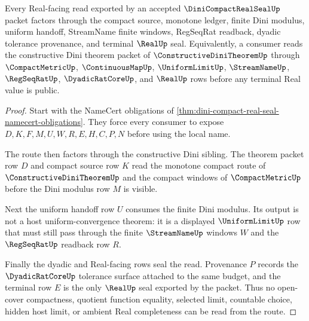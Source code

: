 \begin{theorem}
\label{thm:dini-compact-real-seal-uniform-route}
Every Real-facing read exported by an accepted $\DiniCompactRealSealUp$ packet factors through the compact source, monotone ledger, finite Dini modulus, uniform handoff, StreamName finite windows, RegSeqRat readback, dyadic tolerance provenance, and terminal $\RealUp$ seal. Equivalently, a consumer reads the constructive Dini theorem packet of $\ConstructiveDiniTheoremUp$ through $\CompactMetricUp$, $\ContinuousMapUp$, $\UniformLimitUp$, $\StreamNameUp$, $\RegSeqRatUp$, $\DyadicRatCoreUp$, and $\RealUp$ rows before any terminal Real value is public.
\end{theorem}
\begin{proof}
Start with the NameCert obligations of \autoref{thm:dini-compact-real-seal-namecert-obligations}. They force every consumer to expose $D,K,F,M,U,W,R,E,H,C,P,N$ before using the local name.

The route then factors through the constructive Dini sibling. The theorem packet row $D$ and compact source row $K$ read the monotone compact route of $\ConstructiveDiniTheoremUp$ and the compact windows of $\CompactMetricUp$ before the Dini modulus row $M$ is visible.

Next the uniform handoff row $U$ consumes the finite Dini modulus. Its output is not a host uniform-convergence theorem: it is a displayed $\UniformLimitUp$ row that must still pass through the finite $\StreamNameUp$ windows $W$ and the $\RegSeqRatUp$ readback row $R$.

Finally the dyadic and Real-facing rows seal the read. Provenance $P$ records the $\DyadicRatCoreUp$ tolerance surface attached to the same budget, and the terminal row $E$ is the only $\RealUp$ seal exported by the packet. Thus no open-cover compactness, quotient function equality, selected limit, countable choice, hidden host limit, or ambient Real completeness can be read from the route.
\end{proof}



